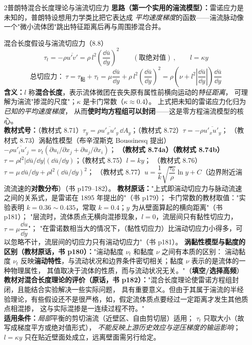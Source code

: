 \begin{kaodian}{2}{普朗特混合长度理论与湍流切应力}
\textbf{思路（第一个实用的湍流模型）：}雷诺应力是未知的，普朗特设想用力学类比把它表达成
\emph{平均速度梯度}的函数——湍流脉动像一个"微小流体团"跳出特征距离后再与周围掺混合并。

\begin{gongshi}{混合长度假设与湍流切应力（8.8）}
\[ \tau_t=-\rho\overline{u'v'}=\rho\,l^2\left(\frac{\dd \bar u}{\dd y}\right)^2
   \qquad(\text{取绝对值})\ ,\qquad l=\kappa y \]
\[ \text{总切应力：}\ \tau=\tau_{\text{黏}}+\tau_t
   =\mu\frac{\dd \bar u}{\dd y}+\rho\,l^2\left(\frac{\dd \bar u}{\dd y}\right)^2
   =\rho\left(\nu+l^2\left|\frac{\dd \bar u}{\dd y}\right|\right)\frac{\dd \bar u}{\dd y} \]
\textbf{含义：}$l$ 称\textbf{混合长度}，表示流体微团在丧失原有属性前横向运动的\emph{特征距离}，
可理解为湍流"掺混的尺度"；$\kappa$ 是卡门常数（$\kappa\approx0.4$）。
上式把未知的雷诺应力化归为\emph{已知的平均速度梯度}，
从而\textbf{使时均方程组可以封闭}——这是零方程湍流模型的核心。\\
\textbf{教材式号：}（教材式 8.71）$\tau_y=\rho\overline{u'_x u'_y}\,\dd A_y$；（教材式 8.72）$\tau=-\rho\overline{u'_x u'_y}$；
（教材式 8.73）涡黏性模型（布辛涅斯克 Boussinesq 提出）$-\rho\overline{u'_iu'_j}=\nu_t\left(\partial u_i/\partial x_j+\partial u_j/\partial x_i\right)$；
\textbf{（教材式 8.74a）（教材式 8.74b）}$\tau=\rho l^2\left|\dd\bar u/\dd y\right|\left(\dd\bar u/\dd y\right)$；（教材式 8.75）$l=ky$；
（教材式 8.76）$\tau=\mu\,\dd\bar u/\dd y+\rho l^2\left(\dd\bar u/\dd y\right)^2$；
（教材式 8.77）$u=\dfrac1k\sqrt{\dfrac{\tau_0}{\rho}}\ln y+C$（边界附近湍流流速的\textbf{对数分布}）（书 p179--182）。
\textbf{教材原话：}"上式即湍动切应力与脉动流速之间的关系式，是雷诺在 1895 年提出的"（书 p179）；
卡门常数的教材取值："实验表明 $k=0.36\sim0.435$，常取 $k=0.4$；$y$ 为从壁面算起的横向距离"（书 p181）；
"层流时，流体质点无横向混掺现象，$l=0$，流层间只有黏性切应力，$\tau=\mu\dfrac{\dd u}{\dd y}$"；
"在雷诺数相当大的情况下，（黏性切应力）比湍动切应力小得多，可以忽略不计，流层间的切应力只有湍动切应力"（书 p181）。
\textbf{涡黏性模型与黏度的区别（教材原话，书 p180）：}"湍动黏度 $\nu_t$ 和黏度 $\nu$ 之间有本质的区别：
湍动黏度 $\nu_t$ 反映\textbf{湍动特性}，与流动状况和边界条件密切相关；黏度 $\nu$ 表示的是流体的一种物理属性，
其值取决于流体的性质，而与流动状况无关。"（\textbf{填空/选择高频}）\\
\textbf{教材对混合长度理论的评价（原话，书 p182）：}"混合长度理论使雷诺方程组封闭，且能结合实验解决一些实际问题，
具有重要意义。但由于其属于湍流的半经验理论，有些假设还不是很严格，如，假定流体质点要经过一定距离才发生其他质点相混掺，
这与实际混掺是一连续过程不符。"\\
\textbf{适用条件：}\emph{局部}平衡的剪切湍流（近壁区、自由剪切层）适用；
$\tau_t$ 只取大小（故写成梯度平方或绝对值形式），
\emph{不能反映上游历史效应与逆压梯度的输运影响}；
$l=\kappa y$ 只在贴近壁面处成立，远离壁面需另行给定。
\end{gongshi}


\end{kaodian}
